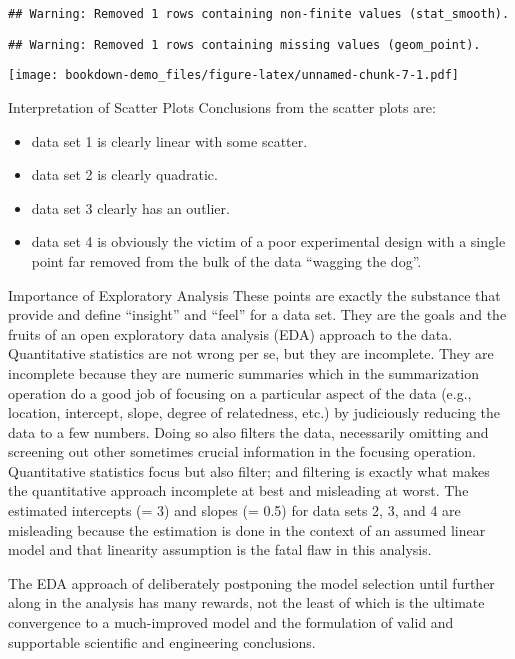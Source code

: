 \documentclass[]{book}
\providecommand{\tightlist}{%
  \setlength{\itemsep}{0pt}\setlength{\parskip}{0pt}}
\theoremstyle{definition}
\theoremstyle{definition}
\theoremstyle{definition}
\theoremstyle{remark}
\begin{document}
\begin{verbatim}
## Warning: Removed 1 rows containing non-finite values (stat_smooth).
\end{verbatim}

\begin{verbatim}
## Warning: Removed 1 rows containing missing values (geom_point).
\end{verbatim}

\texttt{[image: bookdown-demo\_files/figure-latex/unnamed-chunk-7-1.pdf]}

Interpretation of Scatter Plots Conclusions from the scatter plots are:

\begin{itemize}
\tightlist
\item
  data set 1 is clearly linear with some scatter.
\item
  data set 2 is clearly quadratic.
\item
  data set 3 clearly has an outlier.
\item
  data set 4 is obviously the victim of a poor experimental design with
  a single point far removed from the bulk of the data ``wagging the
  dog''.
\end{itemize}

Importance of Exploratory Analysis These points are exactly the
substance that provide and define ``insight'' and ``feel'' for a data
set. They are the goals and the fruits of an open exploratory data
analysis (EDA) approach to the data. Quantitative statistics are not
wrong per se, but they are incomplete. They are incomplete because they
are numeric summaries which in the summarization operation do a good job
of focusing on a particular aspect of the data (e.g., location,
intercept, slope, degree of relatedness, etc.) by judiciously reducing
the data to a few numbers. Doing so also filters the data, necessarily
omitting and screening out other sometimes crucial information in the
focusing operation. Quantitative statistics focus but also filter; and
filtering is exactly what makes the quantitative approach incomplete at
best and misleading at worst. The estimated intercepts (= 3) and slopes
(= 0.5) for data sets 2, 3, and 4 are misleading because the estimation
is done in the context of an assumed linear model and that linearity
assumption is the fatal flaw in this analysis.

The EDA approach of deliberately postponing the model selection until
further along in the analysis has many rewards, not the least of which
is the ultimate convergence to a much-improved model and the formulation
of valid and supportable scientific and engineering conclusions.
\end{document}
